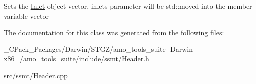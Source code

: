 Sets the \hyperlink{class_inlet}{Inlet} object vector, inlets parameter will be std\+::moved into the member variable vector 

The documentation for this class was generated from the following files\+:\begin{DoxyCompactItemize}
\item 
\+\_\+\+C\+Pack\+\_\+\+Packages/\+Darwin/\+S\+T\+G\+Z/amo\+\_\+tools\+\_\+suite-\/-\/\+Darwin-\/x86\+\_/amo\+\_\+tools\+\_\+suite/include/ssmt/Header.\+h\item 
src/ssmt/Header.\+cpp\end{DoxyCompactItemize}
